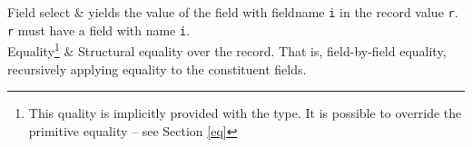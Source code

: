 \item[Semantics of Operators:]  \mbox{}

\begin{TypeSemantics}
Field select & yields the value of the field with fieldname {\tt i}
in the record value {\tt r}. {\tt r} must have a field with name
{\tt i}. \\ \hline
Equality\footnote{This quality is implicitly provided with the type. It is possible to override the primitive equality -- see Section \ref{eq}} & Structural equality over the record. That is, field-by-field equality, recursively applying equality to the constituent fields.\\ \hline
\end{TypeSemantics}

